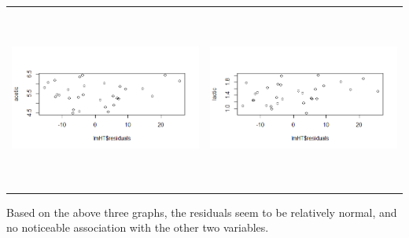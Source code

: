 \documentclass[12pt]{article}
\begin{document}
\begin{center}
	\begin{tabular}{cc}
		\includegraphics[width=.5\textwidth, height=60mm, keepaspectratio]{images/1156/H2S_taste_residuals_vs_acetic.png} & \includegraphics[width=.5\textwidth, height=60mm, keepaspectratio]{images/1156/H2S_taste_residuals_vs_lactic.png}\\
	\end{tabular}\par
	Based on the above three graphs, the residuals seem to be relatively normal, and no noticeable association with the other two variables.\par
	\end{center}\par
	
\newpage
\end{document}
